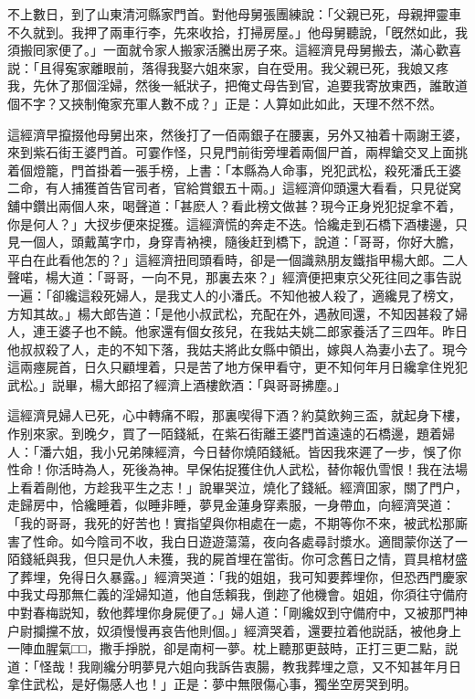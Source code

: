 不上數日，到了山東清河縣家門首。對他母舅張團練說：「父親已死，母親押靈車不久就到。我押了兩車行李，先來收拾，打掃房屋。」他母舅聽說，「旣然如此，我須搬囘家便了。」一面就令家人搬家活騰出房子來。這經濟見母舅搬去，滿心歡喜説：「且得寃家離眼前，落得我娶六姐來家，自在受用。我父親已死，我娘又疼我，先休了那個淫婦，然後一紙狀子，把俺丈母告到官，追要我寄放東西，誰敢道個不字？又挾制俺家充軍人數不成？」正是：人算如此如此，天理不然不然。

這經濟早攛掇他母舅出來，然後打了一佰兩銀子在腰裏，另外又袖着十兩謝王婆，來到紫石街王婆門首。可霎作怪，只見門前街旁埋着兩個尸首，兩桿鎗交叉上面挑着個燈籠，門首掛着一張手榜，上書：「本縣為人命事，兇犯武松，殺死潘氏王婆二命，有人捕獲首告官司者，官給賞銀五十兩。」這經濟仰頭還大看看，只見従窝舖中鑽出兩個人來，喝聲道：「甚麽人？看此榜文做甚？現今正身兇犯捉拿不着，你是何人？」大扠步便來捉獲。這經濟慌的奔走不迭。恰纔走到石橋下酒樓邊，只見一個人，頭戴萬字巾，身穿青衲襖，隨後赶到橋下，說道：「哥哥，你好大膽，平白在此看他怎的？」這經濟扭囘頭看時，卻是一個識熟朋友鐵指甲楊大郎。二人聲喏，楊大道：「哥哥，一向不見，那裏去來？」經濟便把東京父死往囘之事告説一遍：「卻纔這殺死婦人，是我丈人的小潘氏。不知他被人殺了，適纔見了榜文，方知其故。」楊大郎告道：「是他小叔武松，充配在外，遇赦囘還，不知因甚殺了婦人，連王婆子也不饒。他家還有個女孩兒，在我姑夫姚二郎家養活了三四年。昨日他叔叔殺了人，走的不知下落，我姑夫將此女縣中領出，嫁與人為妻小去了。現今這兩瘞屍首，日久只顧埋着，只是苦了地方保甲看守，更不知何年月日纔拿住兇犯武松。」説畢，楊大郎招了經濟上酒樓飲酒：「與哥哥拂塵。」

這經濟見婦人已死，心中轉痛不暇，那裏喫得下酒？約莫飲夠三盃，就起身下樓，作别來家。到晚夕，買了一陌錢紙，在紫石街離王婆門首遠遠的石橋邊，題着婦人：「潘六姐，我小兄弟陳經濟，今日替你燒陌錢紙。皆因我來遲了一步，悞了你性命！你活時為人，死後為神。早保佑捉獲住仇人武松，替你報仇雪恨！我在法場上看着剮他，方趁我平生之志！」說畢哭泣，燒化了錢紙。經濟囬家，關了門户，走歸房中，恰纔睡着，似睡非睡，夢見金蓮身穿素服，一身帶血，向經濟哭道：「我的哥哥，我死的好苦也！實指望與你相處在一處，不期等你不來，被武松那廝害了性命。如今陰司不收，我白日遊遊蕩蕩，夜向各處尋討漿水。適間蒙你送了一陌錢紙與我，但只是仇人未獲，我的屍首埋在當街。你可念舊日之情，買具棺材盛了葬埋，免得日久暴露。」經濟哭道：「我的姐姐，我可知要葬埋你，但恐西門慶家中我丈母那無仁義的淫婦知道，他自恁賴我，倒趂了他機會。姐姐，你須往守備府中對春梅説知，敎他葬埋你身屍便了。」婦人道：「剛纔奴到守備府中，又被那門神户尉攔攩不放，奴須慢慢再哀告他則個。」經濟哭着，還要拉着他説話，被他身上一陣血腥氣□□，撒手掙脱，卻是南柯一夢。枕上聽那更鼓時，正打三更二點，説道：「怪哉！我剛纔分明夢見六姐向我訴告衷腸，教我葬埋之意，又不知甚年月日拿住武松，是好傷感人也！」正是：夢中無限傷心事，獨坐空房哭到明。

